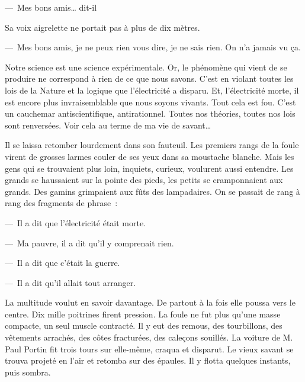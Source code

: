 {—~Mes bons amis… dit-il

Sa voix aigrelette ne portait pas à plus de dix mètres.

—~Mes bons amis, je ne peux rien vous dire, je ne sais rien. On n'a
jamais vu ça.

Notre science est une science expérimentale. Or, le phénomène qui
vient de se produire ne correspond à rien de ce que nous savons.
C'est en violant toutes les lois de la Nature et la logique que
l'électricité a disparu. Et, l'électricité morte, il est encore plus
invraisemblable que nous soyons vivants. Tout cela est fou. C'est un
cauchemar antiscientifique, antirationnel. Toutes nos théories,
toutes nos lois sont renversées. Voir cela au terme de ma vie de
savant…

Il se laissa retomber lourdement dans son fauteuil. Les premiers rangs
de la foule virent de grosses larmes couler de ses yeux dans sa
moustache blanche. Mais les gens qui se trouvaient plus loin,
inquiets, curieux, voulurent aussi entendre. Les grands se haussaient
sur la pointe des pieds, les petits se cramponnaient aux grands. Des
gamins grimpaient aux fûts des lampadaires. On se passait de rang à
rang des fragments de phrase~:

—~Il a dit que l'électricité était morte.

—~Ma pauvre, il a dit qu'il y comprenait rien.

—~Il a dit que c'était la guerre.

—~Il a dit qu'il allait tout arranger.

La multitude voulut en savoir davantage. De partout à la fois elle
poussa vers le centre. Dix mille poitrines firent pression. La foule
ne fut plus qu'une masse compacte, un seul muscle contracté. Il y eut
des remous, des tourbillons, des vêtements arrachés, des côtes
fracturées, des caleçons souillés. La voiture de M. Paul Portin fit
trois tours sur elle-même, craqua et disparut. Le vieux savant se
trouva projeté en l'air et retomba sur des épaules. Il y flotta
quelques instants, puis sombra.
}


